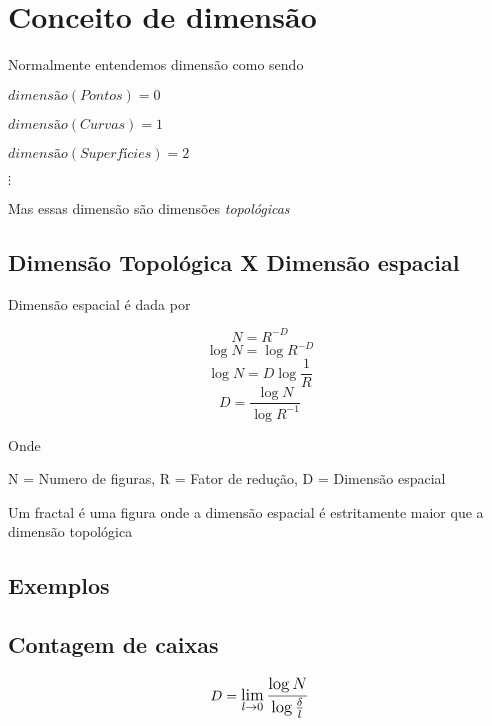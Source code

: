 \chapter{Conceito de dimensão}

Normalmente entendemos dimensão como sendo 

\begin{center}
    \item \( dimensão(Pontos) = 0 \)
    \item \( dimensão(Curvas) = 1 \)
    \item \( dimensão(Superfícies) = 2 \)
    \item \(\vdots \)
\end{center}    

Mas essas dimensão são dimensões \textit{topológicas}

\section{Dimensão Topológica X Dimensão espacial}


Dimensão espacial é dada por

\[ N = R^{-D} \]
\[ \log{N} = \log{R^{-D}} \]
\[ \log{N} = D\log{\frac{1}{R}} \]
\begin{equation}
     D = \frac{\log{N}}{\log{R^{-1}}}
\end{equation}

Onde

N = Numero de figuras,
R = Fator de redução,
D = Dimensão espacial

\begin{definition}[Fractal]
\label{frac}
Um fractal é uma figura onde a dimensão espacial é estritamente maior que a dimensão topológica
\end{definition}

\section{Exemplos}
\section{Contagem de caixas}

\[ D = \mathlarger{
        \lim_{
            l\to0
            } 
        \frac{
            \log{N}
        }{
            \log{
                \frac{
                    \delta
                    }{
                    l
                }
            }
        }
    }  \]

